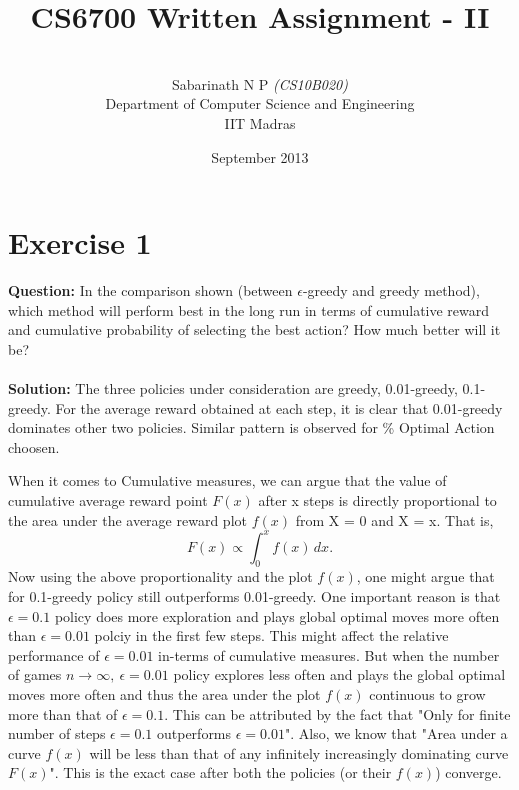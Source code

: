 \documentclass[a4paper,10pt]{report}
\title{\huge{\textbf{CS6700 Written Assignment - II}}}
\author{\\[0.5cm] Sabarinath N P \emph{(CS10B020)}
	\\[0.5cm] Department of Computer Science and Engineering \\[0.2cm]
	IIT Madras\\[1.0cm]
}
\date{September 2013}
\begin{document}
\renewcommand{\thesection}{1.\arabic{section}}

\maketitle
\vfill
\setcounter{tocdepth}{2}

\section{Exercise 1}
\textbf{Question:}
In the comparison shown (between $\epsilon$-greedy and greedy method), which method will perform best in the long run in terms of cumulative reward and cumulative probability of selecting the best action? How much better will it be?
\\\\
\textbf{Solution:}
The three policies under consideration are greedy, 0.01-greedy, 0.1-greedy.
For the average reward obtained at each step, it is clear that 0.01-greedy dominates other two policies. Similar pattern is observed for \% Optimal Action choosen.

When it comes to Cumulative measures, we can argue that the value of cumulative average reward point $F(x)$ after x steps is directly proportional to the area under the average reward plot $f(x)$ from X = 0 and X = x. That is,
\[ F(x) \propto \int_0^x f(x)\,dx.\]
Now using the above proportionality and the plot $f(x)$, one might argue that for 0.1-greedy policy still outperforms 0.01-greedy. One important reason is that $\epsilon=0.1$ policy does more exploration and plays global optimal moves more often than $\epsilon=0.01$ polciy in the first few steps. This might affect the relative performance of $\epsilon=0.01$ in-terms of cumulative measures. But when the number of games $n\rightarrow \infty,\ \epsilon=0.01$ policy explores less often and plays the global optimal moves more often and thus the area under the plot $f(x)$ continuous to grow more than that of $\epsilon=0.1$. This can be attributed by the fact that "Only for finite number of steps $\epsilon=0.1$ outperforms $\epsilon=0.01$". Also, we know that "Area under a curve $f(x)$ will be less than that of any infinitely increasingly dominating curve $F(x)$". This is the exact case after both the policies (or their $f(x)$) converge.
\end{document}
